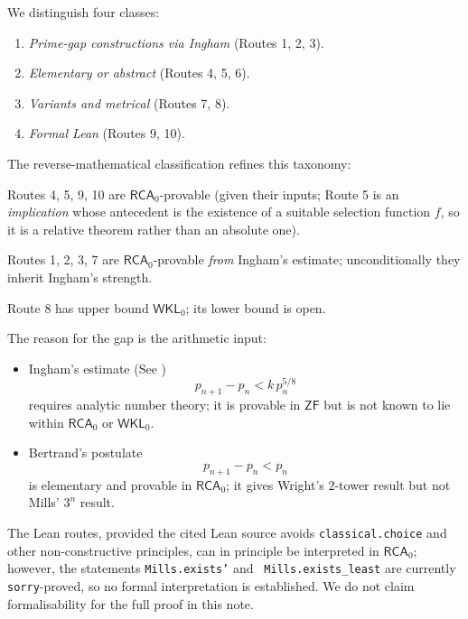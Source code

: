 \documentclass[11pt,reqno]{amsart}
\theoremstyle{redplain}
\numberwithin{equation}{section}
\begin{document}
\label{sec:compare}

\noindent We distinguish four classes:

\begin{enumerate}
\item \emph{Prime-gap constructions via Ingham} (Routes 1, 2, 3).

\item \emph{Elementary or abstract} (Routes 4, 5, 6).

\item \emph{Variants and metrical} (Routes 7, 8).

\item \emph{Formal Lean} (Routes 9, 10).
\end{enumerate}

\noindent The reverse-mathematical classification refines this taxonomy:

Routes 4, 5, 9, 10 are $\mathsf{RCA}_0$-provable (given their inputs; Route
5 is an \emph{implication} whose antecedent is the existence of a suitable
selection function $f$, so it is a relative theorem rather than an absolute
one).

Routes 1, 2, 3, 7 are $\mathsf{RCA}_0$-provable \emph{from} Ingham's
estimate; unconditionally they inherit Ingham's strength.

Route 8 has upper bound $\mathsf{WKL}_0$; its lower bound is open.

\noindent The reason for the gap is the arithmetic input:

\begin{itemize}
\item Ingham's estimate (\textsf{See} \cite{Ingham1937} )%
\begin{equation*}
p_{n+1}-p_{n}<k\,p_{n}^{5/8}
\end{equation*}
requires analytic number theory; it is provable in $\mathsf{ZF}$ but is not
known to lie within $\mathsf{RCA}_{0}$ or $\mathsf{WKL}_{0}$.

\item Bertrand's postulate 
\begin{equation*}
p_{n+1}-p_{n}<p_{n}
\end{equation*}
\cite{HardyWright1960} is elementary and provable in $\mathsf{RCA}_{0}$; it
gives Wright's $2$-tower result but not Mills' $3^{n}$ result.
\end{itemize}

\noindent The Lean routes, provided the cited Lean source \cite%
{FormalConjectures} avoids \texttt{classical.choice} and other
non-constructive principles, can in principle be interpreted in $\mathsf{RCA}%
_0$; however, the statements \texttt{Mills.exists'} and \texttt{%
Mills.exists\_least} are currently \texttt{sorry}-proved, so no formal
interpretation is established. We do not claim formalisability for the full
proof in this note.
\end{document}
